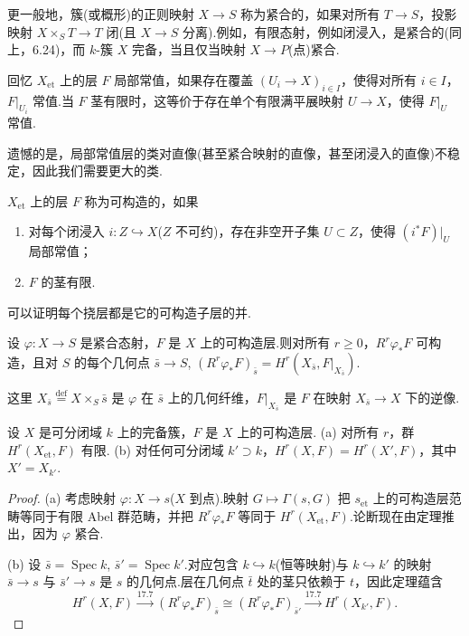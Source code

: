更一般地，簇(或概形)的正则映射 $X \to S$ 称为紧合的，如果对所有 $T \to S$，投影映射 $X \times_{S} T \to T$ 闭(且 $X \to S$ 分离).例如，有限态射，例如闭浸入，是紧合的(同上，6.24)，而 $k$-簇 $X$ 完备，当且仅当映射 $X \to P$(点)紧合.

回忆 $X_{\mathrm{et}}$ 上的层 $F$ 局部常值，如果存在覆盖 $(U_i \to X)_{i \in I}$，使得对所有 $i \in I$，$F|_{U_i}$ 常值.当 $F$ 茎有限时，这等价于存在单个有限满平展映射 $U \to X$，使得 $F|_{U}$ 常值.

遗憾的是，局部常值层的类对直像(甚至紧合映射的直像，甚至闭浸入的直像)不稳定，因此我们需要更大的类.

\begin{definition}\label{def:17.5}
$X_{\mathrm{et}}$ 上的层 $F$ 称为可构造的，如果
\begin{enumerate}
  \item 对每个闭浸入 $i \colon Z \hookrightarrow X$($Z$ 不可约)，存在非空开子集 $U \subset Z$，使得 $(i^{*}F)|_{U}$ 局部常值；
  \item $F$ 的茎有限.
\end{enumerate}
\end{definition}

\begin{remark}\label{rem:17.6}
可以证明每个挠层都是它的可构造子层的并.
\end{remark}

\begin{theorem}\label{thm:17.7}
设 $\varphi \colon X \to S$ 是紧合态射，$F$ 是 $X$ 上的可构造层.则对所有 $r \geq 0$，$R^{r}\varphi_{*}F$ 可构造，且对 $S$ 的每个几何点 $\bar{s} \to S$, $(R^{r}\varphi_{*}F)_{\bar{s}} = H^{r}(X_{\bar{s}}, F|_{X_{\bar{s}}})$.
\end{theorem}

这里 $X_{\bar{s}} \overset{\mathrm{def}}{=} X \times_{S} \bar{s}$ 是 $\varphi$ 在 $\bar{s}$ 上的几何纤维，$F|_{X_{\bar{s}}}$ 是 $F$ 在映射 $X_{\bar{s}} \to X$ 下的逆像.

\begin{corollary}\label{cor:17.8}
设 $X$ 是可分闭域 $k$ 上的完备簇，$F$ 是 $X$ 上的可构造层.
(a) 对所有 $r$，群 $H^{r}(X_{\mathrm{et}}, F)$ 有限.
(b) 对任何可分闭域 $k' \supset k$，$H^{r}(X, F) = H^{r}(X', F)$，其中 $X' = X_{k'}$.
\end{corollary}

\begin{proof}
(a) 考虑映射 $\varphi \colon X \to s$($X$ 到点).映射 $G \mapsto \Gamma(s, G)$ 把 $s_{\mathrm{et}}$ 上的可构造层范畴等同于有限 Abel 群范畴，并把 $R^{r}\varphi_{*}F$ 等同于 $H^{r}(X_{\mathrm{et}}, F)$.论断现在由定理推出，因为 $\varphi$ 紧合.

(b) 设 $\bar{s} = \operatorname{Spec} k$, $\bar{s}' = \operatorname{Spec} k'$.对应包含 $k \hookrightarrow k$(恒等映射)与 $k \hookrightarrow k'$ 的映射 $\bar{s} \to s$ 与 $\bar{s}' \to s$ 是 $s$ 的几何点.层在几何点 $\bar{t}$ 处的茎只依赖于 $t$，因此定理蕴含
\[
H^{r}(X, F) \xrightarrow{17.7} (R^{r}\varphi_{*}F)_{\bar{s}} \cong (R^{r}\varphi_{*}F)_{\bar{s}'} \xrightarrow{17.7} H^{r}(X_{k'}, F).
\]
\end{proof}

